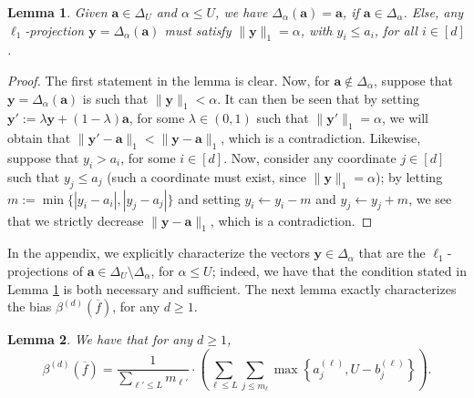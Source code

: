 \documentclass[conference,letterpaper]{IEEEtran}
\newtheorem{lemma}{Lemma}[section]
\theoremstyle{remark}
\theoremstyle{definition}
\begin{document}
\begin{lemma}
	\label{lem:proj1}
	Given $\mathbf{a}\in \Delta_U$ and $\alpha\leq U$, we have $\Delta_\alpha(\mathbf{a}) = \mathbf{a}$, if $\mathbf{a}\in \Delta_{\alpha}$. Else, any $\ell_1$-projection $\mathbf{y} = \Delta_\alpha(\mathbf{a})$ must satisfy $\lVert \mathbf{y}\rVert_1 = \alpha$, with $y_i\leq a_i$, for all $i\in [d]$.
\end{lemma}
\begin{proof}
	The first statement in the lemma is clear. Now, for $\mathbf{a}\notin \Delta_\alpha$, suppose that $\mathbf{y} = \Delta_\alpha(\mathbf{a})$ is such that $\lVert \mathbf{y}\rVert_1 < \alpha$. It can then be seen that by setting $\mathbf{y}':= \lambda\mathbf{y}+(1-\lambda)\mathbf{a}$, for some $\lambda\in (0,1)$ such that $\lVert \mathbf{y}'\rVert_1 = \alpha$, we will obtain that $\lVert \mathbf{y}'-\mathbf{a}\rVert_1 < \lVert \mathbf{y}-\mathbf{a}\rVert_1$, which is a contradiction. Likewise, suppose that $y_i>a_i$, for some $i\in [d]$. Now, consider any coordinate $j\in [d]$ such that $y_j\leq a_j$ (such a coordinate must exist, since $\lVert \mathbf{y}\rVert_1 = \alpha$); by letting $m:= \min\{|y_i-a_i|,|y_j-a_j|\}$ and setting $y_i \gets y_i-m$ and $y_j \gets y_j+m$, we see that we strictly decrease $\lVert \mathbf{y}-\mathbf{a}\rVert_1$, which is a contradiction.
\end{proof}
In the appendix, we explicitly characterize the vectors $\mathbf{y}\in \Delta_\alpha$ that are the $\ell_1$-projections of $\mathbf{a}\in \Delta_U\setminus \Delta_\alpha$, for $\alpha\leq U$; indeed, we have that the condition stated in Lemma \ref{lem:proj1} is both necessary and sufficient. The next lemma exactly characterizes the bias $\beta^{(d)}(\overline{f})$, for any $d\geq 1$.
\begin{lemma}
	\label{lem:proj2}
	We have that for any $d\geq 1$,
	\[\beta^{(d)}(\overline{f}) = \frac{1}{\sum_{\ell'\leq L} m_{\ell'}}\cdot \left(\sum_{\ell\leq L}\sum_{j\leq m_\ell} \max\left\{a_j^{(\ell)},U-b_j^{(\ell)}\right\}\right).\]
\end{lemma}
\end{document}
